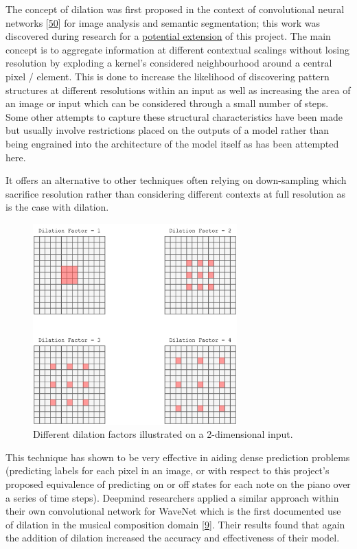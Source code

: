 \documentclass[12pt,]{article}
\begin{document}
The concept of dilation was first proposed in the context of
convolutional neural networks
{[}\protect\hyperlink{ref-yu2015multi}{50}{]} for image analysis and
semantic segmentation; this work was discovered during research for a
\protect\hyperlink{sentimentalinputfromimages}{potential extension} of
this project. The main concept is to aggregate information at different
contextual scalings without losing resolution by exploding a kernel's
considered neighbourhood around a central pixel / element. This is done
to increase the likelihood of discovering pattern structures at
different resolutions within an input as well as increasing the area of
an image or input which can be considered through a small number of
steps. Some other attempts to capture these structural characteristics
have been made but usually involve restrictions placed on the outputs of
a model rather than being engrained into the architecture of the model
itself as has been attempted here.

It offers an alternative to other techniques often relying on
down-sampling which sacrifice resolution rather than considering
different contexts at full resolution as is the case with dilation.

\begin{figure}
\centering
\includegraphics[width=0.7\textwidth,height=\textheight]{Images/dilation2d.png}
\caption{Different dilation factors illustrated on a 2-dimensional
input.}
\end{figure}

This technique has shown to be very effective in aiding dense prediction
problems (predicting labels for each pixel in an image, or with respect
to this project's proposed equivalence of predicting on or off states
for each note on the piano over a series of time steps). Deepmind
researchers applied a similar approach within their own convolutional
network for WaveNet which is the first documented use of dilation in the
musical composition domain
{[}\protect\hyperlink{ref-oord2016wavenet}{9}{]}. Their results found
that again the addition of dilation increased the accuracy and
effectiveness of their model.
\end{document}
